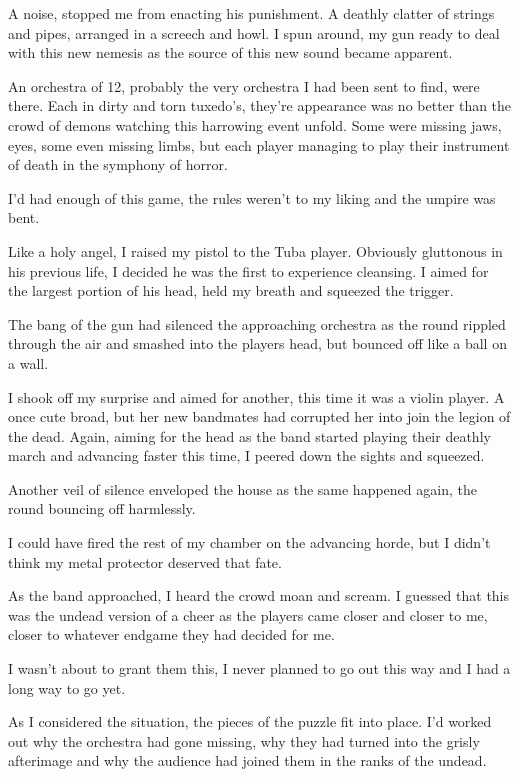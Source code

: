 A noise, stopped me from enacting his punishment. A deathly clatter
of strings and pipes, arranged in a screech and howl. I spun
around, my gun ready to deal with this new nemesis as the source of
this new sound became apparent.

An orchestra of 12, probably the very orchestra I had been sent to
find, were there. Each in dirty and torn tuxedo's,
they're appearance was no better than the crowd of demons
watching this harrowing event unfold. Some were missing jaws, eyes,
some even missing limbs, but each player managing to play their
instrument of death in the symphony of horror.



I'd had enough of this game, the rules weren't to my
liking and the umpire was bent.

Like a holy angel, I raised my pistol to the Tuba player. Obviously
gluttonous in his previous life, I decided he was the first to
experience cleansing. I aimed for the largest portion of his head,
held my breath and squeezed the trigger.

The bang of the gun had silenced the approaching orchestra as the
round rippled through the air and smashed into the players head,
but bounced off like a ball on a wall.



I shook off my surprise and aimed for another, this time it was a
violin player. A once cute broad, but her new bandmates had
corrupted her into join the legion of the dead. Again, aiming for
the head as the band started playing their deathly march and
advancing faster this time, I peered down the sights and
squeezed.

Another veil of silence enveloped the house as the same happened
again, the round bouncing off harmlessly.



I could have fired the rest of my chamber on the advancing horde,
but I didn't think my metal protector deserved that
fate.

As the band approached, I heard the crowd moan and scream. I
guessed that this was the undead version of a cheer as the players
came closer and closer to me, closer to whatever endgame they had
decided for me.

I wasn't about to grant them this, I never planned to go out
this way and I had a long way to go yet.

As I considered the situation, the pieces of the puzzle fit into
place. I'd worked out why the orchestra had gone missing, why
they had turned into the grisly afterimage and why the audience had
joined them in the ranks of the undead.



